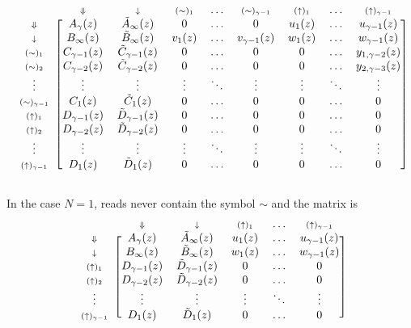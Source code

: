 \documentclass{article}
\newcommand{\DN}{\scriptstyle{\Downarrow}}
\newcommand{\dn}{\scriptstyle{\downarrow}}
\newcommand{\up}[1]{\scriptstyle{(\uparrow)_{#1}}}
\newcommand{\eq}[1]{\scriptstyle{(\sim)_{#1}}}
\begin{document}
\begin{equation*}
\begin{blockarray}{ccccccccc}
   & \DN & \dn &\eq{1} & \ldots & \eq{\gamma-1} &
    \up{1} & \ldots & \up{\gamma-1} \\
\begin{block}{c[cccccccc]}
\DN & A_\gamma(z) & \tilde{A}_\infty(z) & 0 & \ldots & 0 & u_1(z)
    & \ldots & u_{\gamma-1}(z) \\
\dn & B_\infty(z) & \tilde{B}_\infty(z) & v_1(z) & \ldots &
    v_{\gamma-1}(z) & w_1(z) & \ldots & w_{\gamma-1}(z) \\
\eq{1} & C_{\gamma-1}(z) & \tilde{C}_{\gamma-1}(z) & 0 & \ldots & 0 & 0 &
    \ldots & y_{1,\gamma-2}(z) \\
\eq{2} & C_{\gamma-2}(z) & \tilde{C}_{\gamma-2}(z) & 0 & \ldots & 0 & 0 &
    \ldots & y_{2,\gamma-3}(z) \\
\vdots & \vdots & \vdots & \vdots & \ddots & \vdots & \vdots &
    \ddots & \vdots \\
\eq{\gamma-1} & C_1(z) & \tilde{C}_1(z) & 0 & 
    \ldots & 0 & 0 & \ldots & 0 \\
\up{1} & D_{\gamma-1}(z) & \tilde{D}_{\gamma-1}(z) & 0 & \ldots & 0 & 0 &
    \ldots & 0 \\
\up{2} & D_{\gamma-2}(z) & \tilde{D}_{\gamma-2}(z) & 0 & \ldots & 0 & 0 &
    \ldots & 0  \\
\vdots & \vdots & \vdots & \vdots & \ddots & \vdots & \vdots &
    \ddots & \vdots \\
\up{\gamma-1} & D_1(z) & \tilde{D}_1(z) & 0 & \ldots & 0 & 0 &
    \ldots & 0 \\
\end{block}
\end{blockarray}
\end{equation*}

In the case $N = 1$, reads never contain the symbol $\sim$ and the matrix
is
\begin{equation*}
\begin{blockarray}{cccccc}
   & \DN & \dn & \up{1} & \ldots & \up{\gamma-1} \\
\begin{block}{c[ccccc]}
\DN & A_\gamma(z) & \tilde{A}_\infty(z) & u_1(z)
    & \ldots & u_{\gamma-1}(z) \\
\dn & B_\infty(z) & \tilde{B}_\infty(z) & w_1(z)
    & \ldots & w_{\gamma-1}(z) \\
\up{1} & D_{\gamma-1}(z) & \tilde{D}_{\gamma-1}(z) & 0 &
    \ldots & 0 \\
\up{2} & D_{\gamma-2}(z) & \tilde{D}_{\gamma-2}(z) & 0 &
    \ldots & 0  \\
\vdots & \vdots & \vdots & \vdots & \ddots & \vdots \\
\up{\gamma-1} & D_1(z) & \tilde{D}_1(z) & 0 & \ldots & 0 \\
\end{block}
\end{blockarray}
\end{equation*}
\end{document}
